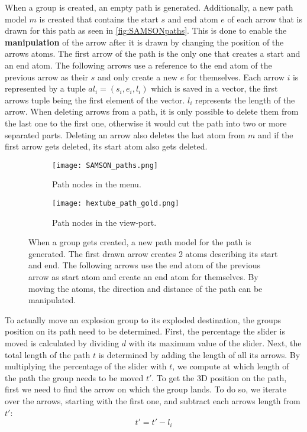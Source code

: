\documentclass[draft,final]{vutinfth} %
\begin{document}
\par When a group is created, an empty path is generated.
Additionally, a new path model $m$ is created that contains the start $s$ and end atom $e$ of each arrow that is drawn for this path as seen in \autoref{fig:SAMSONpaths}. 
This is done to enable the \textbf{manipulation} of the arrow after it is drawn by changing the position of the arrows atoms.
The first arrow of the path is the only one that creates a start and an end atom. 
The following arrows use a reference to the end atom of the previous arrow as their $s$ and only create a new $e$ for themselves.
Each arrow $i$ is represented by a tuple $al_i = (s_i,e_i,l_i)$ which is saved in a vector, the first arrows tuple being the first element of the vector. 
$l_i$ represents the length of the arrow.
When deleting arrows from a path, it is only possible to delete them from the last one to the first one, otherwise it would cut the path into two or more separated parts. 
Deleting an arrow also deletes the last atom from $m$ and if the first arrow gets deleted, its start atom also gets deleted.

\begin{figure}
\centering
\begin{subfigure}{0.4\textwidth}
  \centering
  \texttt{[image: SAMSON\_paths.png]}
  \caption{Path nodes in the menu.}
  \label{fig:SAMSONpathStruc}
\end{subfigure}%
\begin{subfigure}{0.4\textwidth}
  \centering
  \texttt{[image: hextube\_path\_gold.png]}
  \caption{Path nodes in the view-port.}
  \label{fig:pathsGold}
\end{subfigure}
\caption{When a group gets created, a new path model for the path is generated. The first drawn arrow creates 2 atoms describing its start and end. The following arrows use the end atom of the previous arrow as start atom and create an end atom for themselves. By moving the atoms, the direction and distance of the path can be manipulated.}
\label{fig:SAMSONpaths}
\end{figure}

To actually move an explosion group to its exploded destination, the groups position on its path need to be determined. 
First, the percentage the slider is moved is calculated by dividing $d$ with its maximum value of the slider. 
Next, the total length of the path $t$ is determined by adding the length of all its arrows. 
By multiplying the percentage of the slider with $t$, we compute at which length of the path the group needs to be moved $t'$. 
To get the 3D position on the path, first we need to find the arrow on which the group lands.
To do so, we iterate over the arrows, starting with the first one, and subtract each arrows length from $t'$:
\begin{equation}
\label{eq:t_path}
t' = t' - l_i
\end{equation}
\end{document}
